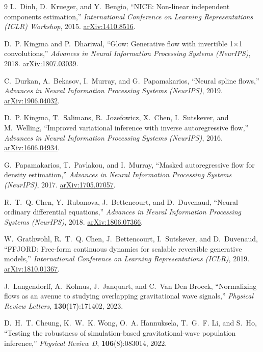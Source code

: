 \documentclass[11pt,letterpaper]{article}
\begin{document}
\begin{thebibliography}{9}
L.~Dinh, D.~Krueger, and Y.~Bengio,
``NICE: Non-linear independent components estimation,''
\textit{International Conference on Learning Representations (ICLR) Workshop}, 2015.
\href{https://arxiv.org/abs/1410.8516}{arXiv:1410.8516}.

D.~P. Kingma and P.~Dhariwal,
``Glow: Generative flow with invertible 1$\times$1 convolutions,''
\textit{Advances in Neural Information Processing Systems (NeurIPS)}, 2018.
\href{https://arxiv.org/abs/1807.03039}{arXiv:1807.03039}.

C.~Durkan, A.~Bekasov, I.~Murray, and G.~Papamakarios,
``Neural spline flows,''
\textit{Advances in Neural Information Processing Systems (NeurIPS)}, 2019.
\href{https://arxiv.org/abs/1906.04032}{arXiv:1906.04032}.

D.~P. Kingma, T.~Salimans, R.~Jozefowicz, X.~Chen, I.~Sutskever, and M.~Welling,
``Improved variational inference with inverse autoregressive flow,''
\textit{Advances in Neural Information Processing Systems (NeurIPS)}, 2016.
\href{https://arxiv.org/abs/1606.04934}{arXiv:1606.04934}.

G.~Papamakarios, T.~Pavlakou, and I.~Murray,
``Masked autoregressive flow for density estimation,''
\textit{Advances in Neural Information Processing Systems (NeurIPS)}, 2017.
\href{https://arxiv.org/abs/1705.07057}{arXiv:1705.07057}.

R.~T.~Q. Chen, Y.~Rubanova, J.~Bettencourt, and D.~Duvenaud,
``Neural ordinary differential equations,''
\textit{Advances in Neural Information Processing Systems (NeurIPS)}, 2018.
\href{https://arxiv.org/abs/1806.07366}{arXiv:1806.07366}.

W.~Grathwohl, R.~T.~Q. Chen, J.~Bettencourt, I.~Sutskever, and D.~Duvenaud,
``FFJORD: Free-form continuous dynamics for scalable reversible generative models,''
\textit{International Conference on Learning Representations (ICLR)}, 2019.
\href{https://arxiv.org/abs/1810.01367}{arXiv:1810.01367}.

J.~Langendorff, A.~Kolmus, J.~Janquart, and C.~Van Den Broeck,
``Normalizing flows as an avenue to studying overlapping gravitational wave signals,''
\textit{Physical Review Letters}, \textbf{130}(17):171402, 2023.

D.~H.~T. Cheung, K.~W.~K. Wong, O.~A. Hannuksela, T.~G.~F. Li, and S.~Ho,
``Testing the robustness of simulation-based gravitational-wave population inference,''
\textit{Physical Review D}, \textbf{106}(8):083014, 2022.

\end{thebibliography}
\end{document}
